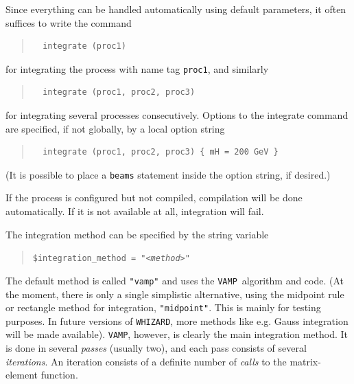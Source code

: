 \documentclass[12pt]{book}
\newcommand{\ttt}[1]{\texttt{#1}}
\newcommand{\whizard}{\ttt{WHIZARD}}
\newcommand{\vamp}{\ttt{VAMP}}
\begin{document}
Since everything can be handled automatically using default parameters, it
often suffices to write the command
\begin{quote}
\begin{footnotesize}
\begin{verbatim}
  integrate (proc1)
\end{verbatim}
\end{footnotesize}
\end{quote}
for integrating the process with name tag \ttt{proc1}, and similarly
\begin{quote}
\begin{footnotesize}
\begin{verbatim}
  integrate (proc1, proc2, proc3)
\end{verbatim}
\end{footnotesize}
\end{quote}
for integrating several processes consecutively.  Options to the integrate
command are specified, if not globally, by a local option string
\begin{quote}
\begin{footnotesize}
\begin{verbatim}
  integrate (proc1, proc2, proc3) { mH = 200 GeV }
\end{verbatim}
\end{footnotesize}
\end{quote}
(It is possible to place a \ttt{beams} statement inside the option string, if
desired.)

If the process is configured but not compiled, compilation will be done
automatically.   If it is not available at all, integration will fail.

The integration method can be specified by the string variable
\begin{quote}
\begin{footnotesize}
  \ttt{\$integration\_method = "{\em <method>}"}
\end{footnotesize}
\end{quote} %
The default method is called \ttt{"vamp"} and uses the \vamp\
algorithm and code. (At the moment, there is only a single simplistic
alternative, using the midpoint rule or rectangle method for
integration, \ttt{"midpoint"}. This is mainly for testing purposes. In
future versions of \whizard, more methods like e.g. Gauss integration
will be made available). \vamp, however, is clearly the main
integration method. It is done in several \emph{passes} (usually two),
and each pass consists of several \emph{iterations}.  An iteration
consists of a definite number of \emph{calls} to the matrix-element
function.
\end{document}

